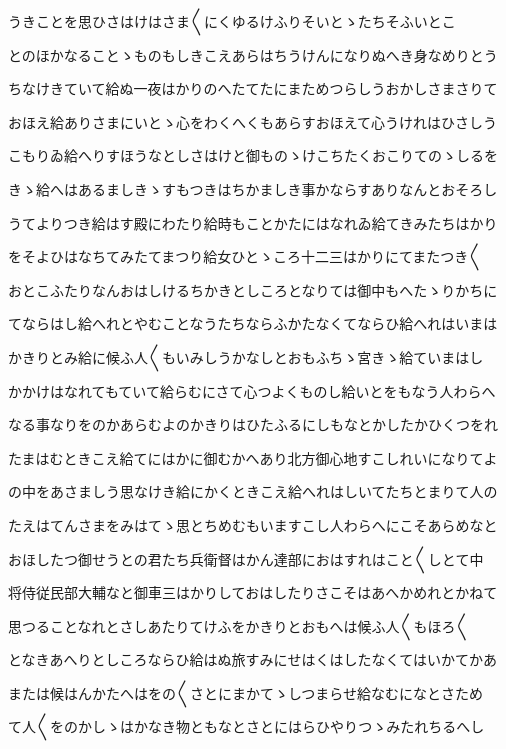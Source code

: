 \documentclass[a4paper,11pt,landscape]{ltjtarticle}
\begin{document}
うきことを思ひさはけはさま〱にくゆるけふりそいとゝたちそふいとこ
\par\medskip
とのほかなることゝものもしきこえあらはちうけんになりぬへき身なめりとう
\par\medskip
ちなけきていて給ぬ一夜はかりのへたてたにまためつらしうおかしさまさりて
\par\medskip
おほえ給ありさまにいとゝ心をわくへくもあらすおほえて心うけれはひさしう
\par\medskip
こもりゐ給へりすほうなとしさはけと御ものゝけこちたくおこりてのゝしるを
\par\medskip
きゝ給へはあるましきゝすもつきはちかましき事かならすありなんとおそろし
\par\medskip
うてよりつき給はす殿にわたり給時もことかたにはなれゐ給てきみたちはかり
\par\medskip
をそよひはなちてみたてまつり給女ひとゝころ十二三はかりにてまたつき〱
\par\medskip
おとこふたりなんおはしけるちかきとしころとなりては御中もへたゝりかちに
\par\medskip
てならはし給へれとやむことなうたちならふかたなくてならひ給へれはいまは
\par\medskip
かきりとみ給に候ふ人〱もいみしうかなしとおもふちゝ宮きゝ給ていまはし
\par\medskip
かかけはなれてもていて給らむにさて心つよくものし給いとをもなう人わらへ
\par\medskip
なる事なりをのかあらむよのかきりはひたふるにしもなとかしたかひくつをれ
\par\medskip
たまはむときこえ給てにはかに御むかへあり北方御心地すこしれいになりてよ
\par\medskip
の中をあさましう思なけき給にかくときこえ給へれはしいてたちとまりて人の
\par\medskip
たえはてんさまをみはてゝ思とちめむもいますこし人わらへにこそあらめなと
\par\medskip
おほしたつ御せうとの君たち兵衛督はかん達部におはすれはこと〱しとて中
\par\medskip
将侍従民部大輔なと御車三はかりしておはしたりさこそはあへかめれとかねて
\par\medskip
思つることなれとさしあたりてけふをかきりとおもへは候ふ人〱もほろ〱
\par\medskip
となきあへりとしころならひ給はぬ旅すみにせはくはしたなくてはいかてかあ
\par\medskip
または候はんかたへはをの〱さとにまかてゝしつまらせ給なむになとさため
\par\medskip
て人〱をのかしゝはかなき物ともなとさとにはらひやりつゝみたれちるへし
\end{document}

